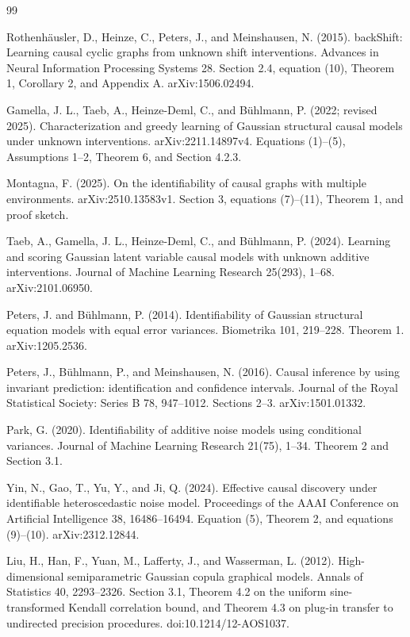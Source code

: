 \documentclass{article}
\begin{document}
\begin{thebibliography}{99}

   Rothenhäusler, D., Heinze, C., Peters, J., and Meinshausen, N. (2015). backShift: Learning causal cyclic graphs from unknown shift interventions. Advances in Neural Information Processing Systems 28. Section 2.4, equation (10), Theorem 1, Corollary 2, and Appendix A. arXiv:1506.02494.

   Gamella, J. L., Taeb, A., Heinze-Deml, C., and Bühlmann, P. (2022; revised 2025). Characterization and greedy learning of Gaussian structural causal models under unknown interventions. arXiv:2211.14897v4. Equations (1)--(5), Assumptions 1--2, Theorem 6, and Section 4.2.3.

   Montagna, F. (2025). On the identifiability of causal graphs with multiple environments. arXiv:2510.13583v1. Section 3, equations (7)--(11), Theorem 1, and proof sketch.

   Taeb, A., Gamella, J. L., Heinze-Deml, C., and Bühlmann, P. (2024). Learning and scoring Gaussian latent variable causal models with unknown additive interventions. Journal of Machine Learning Research 25(293), 1--68. arXiv:2101.06950.

   Peters, J. and Bühlmann, P. (2014). Identifiability of Gaussian structural equation models with equal error variances. Biometrika 101, 219--228. Theorem 1. arXiv:1205.2536.

   Peters, J., Bühlmann, P., and Meinshausen, N. (2016). Causal inference by using invariant prediction: identification and confidence intervals. Journal of the Royal Statistical Society: Series B 78, 947--1012. Sections 2--3. arXiv:1501.01332.

   Park, G. (2020). Identifiability of additive noise models using conditional variances. Journal of Machine Learning Research 21(75), 1--34. Theorem 2 and Section 3.1.

   Yin, N., Gao, T., Yu, Y., and Ji, Q. (2024). Effective causal discovery under identifiable heteroscedastic noise model. Proceedings of the AAAI Conference on Artificial Intelligence 38, 16486--16494. Equation (5), Theorem 2, and equations (9)--(10). arXiv:2312.12844.

   Liu, H., Han, F., Yuan, M., Lafferty, J., and Wasserman, L. (2012). High-dimensional semiparametric Gaussian copula graphical models. Annals of Statistics 40, 2293--2326. Section 3.1, Theorem 4.2 on the uniform sine-transformed Kendall correlation bound, and Theorem 4.3 on plug-in transfer to undirected precision procedures. doi:10.1214/12-AOS1037.


\end{thebibliography}
\end{document}
